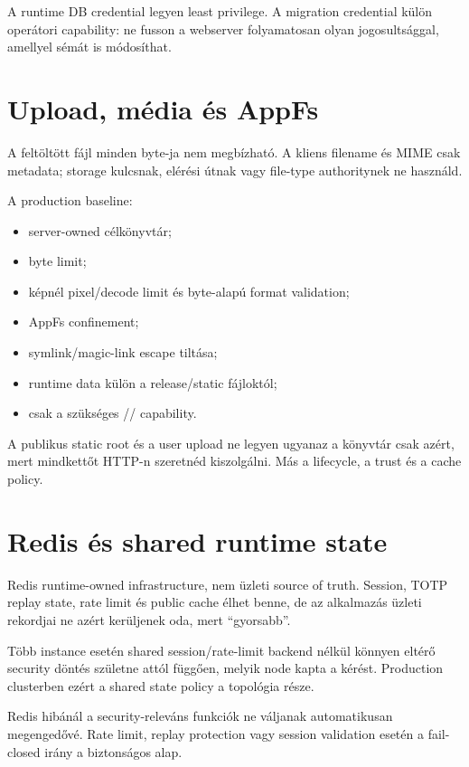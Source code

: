 A runtime DB credential legyen least privilege. A migration credential külön operátori capability: ne fusson a webserver folyamatosan olyan jogosultsággal, amellyel sémát is módosíthat.

\section{Upload, média és AppFs}

A feltöltött fájl minden byte-ja nem megbízható. A kliens filename és MIME csak metadata; storage kulcsnak, elérési útnak vagy file-type authoritynek ne használd.

A production baseline:

\begin{itemize}
  \item server-owned célkönyvtár;
  \item byte limit;
  \item képnél pixel/decode limit és byte-alapú format validation;
  \item AppFs confinement;
  \item symlink/magic-link escape tiltása;
  \item runtime data külön a release/static fájloktól;
  \item csak a szükséges // capability.
\end{itemize}

A publikus static root és a user upload ne legyen ugyanaz a könyvtár csak azért, mert mindkettőt HTTP-n szeretnéd kiszolgálni. Más a lifecycle, a trust és a cache policy.

\section{Redis és shared runtime state}

Redis runtime-owned infrastructure, nem üzleti source of truth. Session, TOTP replay state, rate limit és public cache élhet benne, de az alkalmazás üzleti rekordjai ne azért kerüljenek oda, mert ``gyorsabb''.

Több instance esetén shared session/rate-limit backend nélkül könnyen eltérő security döntés születne attól függően, melyik node kapta a kérést. Production clusterben ezért a shared state policy a topológia része.

Redis hibánál a security-releváns funkciók ne váljanak automatikusan megengedővé. Rate limit, replay protection vagy session validation esetén a fail-closed irány a biztonságos alap.

